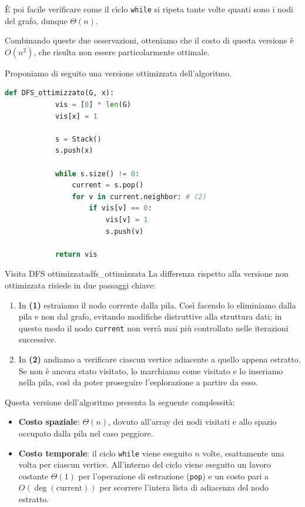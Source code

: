 \documentclass[12pt]{report}
\begin{document}
	È poi facile verificare come il ciclo \texttt{while} si ripeta tante volte quanti sono i nodi del grafo, dunque $\Theta(n)$.
	
	Combinando queste due osservazioni, otteniamo che il costo di questa versione è $O(n^2)$, che risulta non essere particolarmente ottimale.
	
	\newpage
	Proponiamo di seguito una versione ottimizzata dell'algoritmo.	
	\begin{lstlisting}[style=stile-listings, language=Python]
		def DFS_ottimizzato(G, x):
			vis = [0] * len(G)
			vis[x] = 1
			
			s = Stack()
			s.push(x)
			
			while s.size() != 0:
				current = s.pop()
				for v in current.neighbor: # (2)
					if vis[v] == 0:
						vis[v] = 1
						s.push(v)
			
			return vis
	\end{lstlisting}
	
	\begin{algoritmo}{Visita DFS ottimizzata}{dfs_ottimizzata}
		La differenza rispetto alla versione non ottimizzata risiede in due passaggi chiave:
		\begin{enumerate}
			\item In \textbf{(1)} estraiamo il nodo corrente dalla pila. Così facendo lo eliminiamo dalla pila e non dal grafo, evitando modifiche distruttive alla struttura dati; in questo modo il nodo \texttt{current} non verrà mai più controllato nelle iterazioni successive.
			\item In \textbf{(2)} andiamo a verificare ciascun vertice adiacente a quello appena estratto. Se non è ancora stato visitato, lo marchiamo come visitato e lo inseriamo nella pila, così da poter proseguire l'esplorazione a partire da esso.
		\end{enumerate}
	\end{algoritmo}
	
	Questa versione dell'algoritmo presenta la seguente complessità:
	\begin{itemize}
		\item \textbf{Costo spaziale}: $\Theta(n)$, dovuto all'array dei nodi visitati e allo spazio occupato dalla pila nel caso peggiore.
		\item \textbf{Costo temporale}: il ciclo \texttt{while} viene eseguito $n$ volte, esattamente una volta per ciascun vertice. All'interno del ciclo viene eseguito un lavoro costante $\Theta(1)$ per l'operazione di estrazione (\texttt{pop}) e un costo pari a $O(\operatorname{deg}(\text{current}))$ per scorrere l'intera lista di adiacenza del nodo estratto.
	\end{itemize}
	
\end{document}
